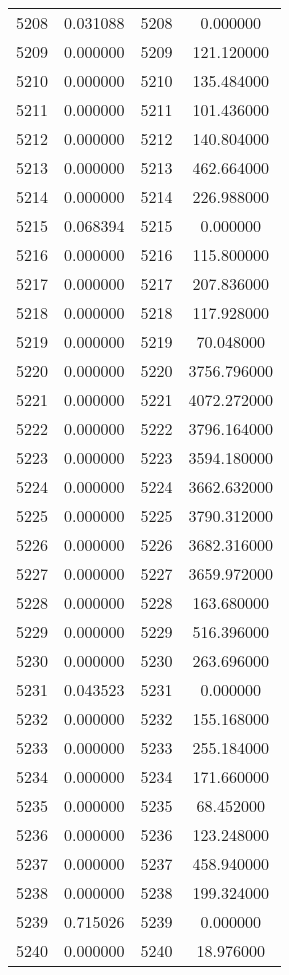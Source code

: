 \documentclass[12pt]{article}
\begin{document}
\begin{longtable}{@{}cccc@{}}
5208 & 0.031088 & 5208 & 0.000000 \\
5209 & 0.000000 & 5209 & 121.120000 \\
5210 & 0.000000 & 5210 & 135.484000 \\
5211 & 0.000000 & 5211 & 101.436000 \\
5212 & 0.000000 & 5212 & 140.804000 \\
5213 & 0.000000 & 5213 & 462.664000 \\
5214 & 0.000000 & 5214 & 226.988000 \\
5215 & 0.068394 & 5215 & 0.000000 \\
5216 & 0.000000 & 5216 & 115.800000 \\
5217 & 0.000000 & 5217 & 207.836000 \\
5218 & 0.000000 & 5218 & 117.928000 \\
5219 & 0.000000 & 5219 & 70.048000 \\
5220 & 0.000000 & 5220 & 3756.796000 \\
5221 & 0.000000 & 5221 & 4072.272000 \\
5222 & 0.000000 & 5222 & 3796.164000 \\
5223 & 0.000000 & 5223 & 3594.180000 \\
5224 & 0.000000 & 5224 & 3662.632000 \\
5225 & 0.000000 & 5225 & 3790.312000 \\
5226 & 0.000000 & 5226 & 3682.316000 \\
5227 & 0.000000 & 5227 & 3659.972000 \\
5228 & 0.000000 & 5228 & 163.680000 \\
5229 & 0.000000 & 5229 & 516.396000 \\
5230 & 0.000000 & 5230 & 263.696000 \\
5231 & 0.043523 & 5231 & 0.000000 \\
5232 & 0.000000 & 5232 & 155.168000 \\
5233 & 0.000000 & 5233 & 255.184000 \\
5234 & 0.000000 & 5234 & 171.660000 \\
5235 & 0.000000 & 5235 & 68.452000 \\
5236 & 0.000000 & 5236 & 123.248000 \\
5237 & 0.000000 & 5237 & 458.940000 \\
5238 & 0.000000 & 5238 & 199.324000 \\
5239 & 0.715026 & 5239 & 0.000000 \\
5240 & 0.000000 & 5240 & 18.976000 \\

\end{longtable}
\end{document}
